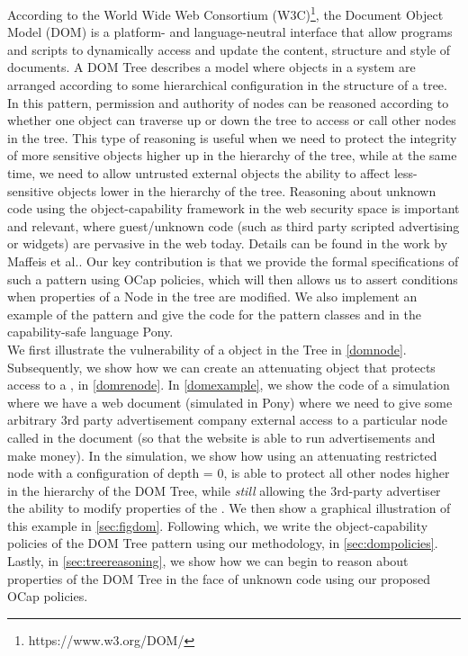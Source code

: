 \documentclass[a4paper,11pt,twoside]{article}
\begin{document}
According to the World Wide Web Consortium (W3C)\footnote{https://www.w3.org/DOM/}, the Document Object Model (DOM) is a platform- and language-neutral interface that allow programs and scripts to dynamically access and update the content, structure and style of documents. A DOM Tree describes a model where objects in a system are arranged according to some hierarchical configuration in the structure of a tree. In this pattern, permission and authority of nodes can be reasoned according to whether one object can traverse up or down the tree to access or call other nodes in the tree. This type of reasoning is useful when we need to protect the integrity of more sensitive objects higher up in the hierarchy of the tree, while at the same time, we need to allow untrusted external objects the ability to affect less-sensitive objects lower in the hierarchy of the tree. Reasoning about unknown code using the object-capability framework in the web security space is important and relevant, where guest/unknown code (such as third party scripted advertising or widgets) are pervasive in the web today. Details can be found in the work by Maffeis et al.\cite{maffeis2010}. Our key contribution is that we provide the formal specifications of such a pattern using OCap policies, which will then allows us to assert conditions when properties of a Node in the tree are modified. We also implement an example of the pattern and give the code for the pattern classes  and  in the capability-safe language Pony.\\


We first illustrate the vulnerability of a  object in the Tree in \cref{domnode}. Subsequently, we show how we can create an attenuating object  that protects access to a , in \cref{domrenode}. In \cref{domexample}, we show the code of a simulation where we have a web document (simulated in Pony) where we need to give some arbitrary 3rd party advertisement company external access to a particular node called  in the document (so that the website is able to run advertisements and make money). In the simulation, we show how using an attenuating restricted node  with a configuration of depth = 0, is able to protect all other nodes higher in the hierarchy of the DOM Tree, while \textit{still} allowing the 3rd-party advertiser the ability to modify properties of the . We then show a graphical illustration of this example in \cref{sec:figdom}. Following which, we write the object-capability policies of the DOM Tree pattern using our methodology, in \cref{sec:dompolicies}. Lastly, in \cref{sec:treereasoning}, we show how we can begin to reason about properties of the DOM Tree in the face of unknown code using our proposed OCap policies.
\end{document}
